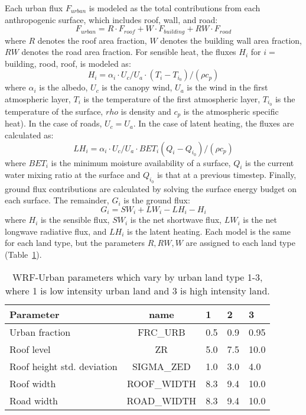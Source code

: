 Each urban flux $F_{urban}$ is modeled as the total contributions from each anthropogenic surface, which includes roof, wall, and road: 
\[ F_{urban} = R\cdot F_{roof} + W\cdot F_{building} + RW\cdot F_{road} \]
where $R$ denotes the roof area fraction, $W$ denotes the building wall area fraction, $RW$ denotes the road area fraction. 
For sensible heat, the fluxes $H_i$ for $i=$building, rood, roof, is modeled as: 
\[H_i = \alpha_i\cdot U_c/U_a \cdot \left( T_i - T_{i_0}\right) / \left( \rho c_p \right ) \] 
where $\alpha_i $ is the albedo, $U_c$ is the canopy wind, $U_a$ is the wind in the first atmospheric layer, $T_i$ is the temperature of the first atmospheric layer, $T_{i_0}$ is the temperature of the surface, $rho$ is density and $c_p$ is the atmospheric specific heat). In the case of roads, $U_c = U_a$.
In the case of latent heating, the fluxes are calculated as: 
\[LH_i = \alpha_i \cdot U_c/U_a \cdot BET_i \left( Q_i - Q_{i_0}\right) / \left( \rho c_p \right ) \] 
where $BET_i$ is the minimum moisture availability of a surface, $Q_i$ is the current water mixing ratio at the surface and $Q_{i_0}$ is that at a previous timestep.
Finally, ground flux contributions are calculated by solving the surface energy budget on each surface. The remainder, $G_i$ is the ground flux: 
\[ G_i = SW_i + LW_i - LH_i -H_i\]
where $H_i$ is the sensible flux, $SW_i$ is the net shortwave flux, $LW_i$ is the net longwave radiative flux, and $LH_i$ is the latent heating. 
Each model is the same for each land type, but the parameters $R, RW, W$ are assigned to each land type (Table~\ref{tab:urban_model}). 

\begin{table}
\begin{tabular}{lclll}
\toprule
Parameter & name & 1 & 2 & 3 \\
\midrule
Urban fraction &  \textsc{FRC\_URB} & 0.5 & 0.9 & 0.95 \\
Roof level &\textsc{ZR} &5.0&  7.5 & 10.0 \\
Roof height std. deviation & \textsc{SIGMA\_ZED} & 1.0 &  3.0 &  4.0\\
Roof width &  \textsc{ROOF\_WIDTH} & 8.3& 9.4 & 10.0 \\
Road width & \textsc{ROAD\_WIDTH} &  8.3&  9.4&  10.0 \\
\bottomrule
\end{tabular} 
\caption{WRF-Urban parameters which vary by urban land type 1-3, where 1 is low intensity urban land and 3 is high intensity land.}
\label{tab:urban_model}
\end{table}

